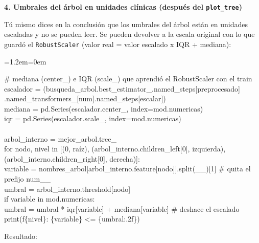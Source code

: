 \documentclass[11pt,a4paper]{article}
\newenvironment{codigo}
  {\par\smallskip\begin{list}{}{\leftmargin=1.2em\rightmargin=0em}\item\relax\ttfamily\scriptsize\raggedright}
  {\end{list}\smallskip}
\begin{document}
{\smallskip\noindent\textbf{4. Umbrales del árbol en unidades clínicas (después del \texttt{plot\_\allowbreak{}tree})}\par
Tú mismo dices en la conclusión que los umbrales del árbol están en unidades escaladas y no se pueden leer. Se pueden devolver a la escala original con lo que guardó el \texttt{RobustScaler} (valor real = valor escalado x IQR + mediana):

\begin{codigo}
\# mediana (center\_\allowbreak{}) e IQR (scale\_\allowbreak{}) que aprendió el RobustScaler con el train \\{}
escalador = (busqueda\_\allowbreak{}arbol.best\_\allowbreak{}estimator\_\allowbreak{}.named\_\allowbreak{}steps[\textquotedbl{}preprocesado\textquotedbl{}] \\{}
\hspace*{6.76em}.named\_\allowbreak{}transformers\_\allowbreak{}[\textquotedbl{}num\textquotedbl{}].named\_\allowbreak{}steps[\textquotedbl{}escalar\textquotedbl{}]) \\{}
mediana = pd.Series(escalador.center\_\allowbreak{}, index=mod.numericas) \\{}
iqr = pd.Series(escalador.scale\_\allowbreak{}, index=mod.numericas) \\{}
\mbox{} \\{}
arbol\_\allowbreak{}interno = mejor\_\allowbreak{}arbol.tree\_\allowbreak{} \\{}
for nodo, nivel in [(0, \textquotedbl{}raíz\textquotedbl{}), (arbol\_\allowbreak{}interno.children\_\allowbreak{}left[0], \textquotedbl{}izquierda\textquotedbl{}), (arbol\_\allowbreak{}interno.children\_\allowbreak{}right[0], \textquotedbl{}derecha\textquotedbl{})]: \\{}
\hspace*{2.08em}variable = nombres\_\allowbreak{}arbol[arbol\_\allowbreak{}interno.feature[nodo]].split(\textquotedbl{}\_\allowbreak{}\_\allowbreak{}\textquotedbl{})[1]   \# quita el prefijo \textquotedbl{}num\_\allowbreak{}\_\allowbreak{}\textquotedbl{} \\{}
\hspace*{2.08em}umbral = arbol\_\allowbreak{}interno.threshold[nodo] \\{}
\hspace*{2.08em}if variable in mod.numericas: \\{}
\hspace*{4.16em}umbral = umbral * iqr[variable] + mediana[variable]                 \# deshace el escalado \\{}
\hspace*{2.08em}print(f\textquotedbl{}\{nivel\}: \{variable\} \textless{}= \{umbral:.2f\}\textquotedbl{})
\end{codigo}
Resultado:

}
\end{document}

